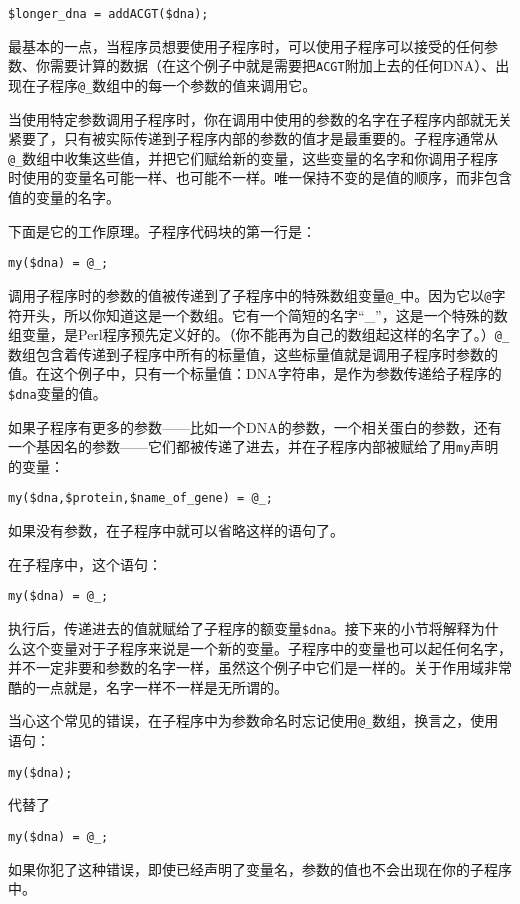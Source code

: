 \begin{lstlisting}
$longer_dna = addACGT($dna);
\end{lstlisting}

最基本的一点，当程序员想要使用子程序时，可以使用子程序可以接受的任何参数、你需要计算的数据（在这个例子中就是需要把\verb|ACGT|附加上去的任何DNA）、出现在子程序\verb|@_|数组中的每一个参数的值来调用它。

当使用特定参数调用子程序时，你在调用中使用的参数的名字在子程序内部就无关紧要了，只有被实际传递到子程序内部的参数的值才是最重要的。子程序通常从\verb|@_|数组中收集这些值，并把它们赋给新的变量，这些变量的名字和你调用子程序时使用的变量名可能一样、也可能不一样。唯一保持不变的是值的顺序，而非包含值的变量的名字。

下面是它的工作原理。子程序代码块的第一行是：

\begin{lstlisting}
my($dna) = @_; 
\end{lstlisting}

调用子程序时的参数的值被传递到了子程序中的特殊数组变量\verb|@_|中。因为它以\verb|@|字符开头，所以你知道这是一个数组。它有一个简短的名字“\_”，这是一个特殊的数组变量，是Perl程序预先定义好的。（你不能再为自己的数组起这样的名字了。）\verb|@_|数组包含着传递到子程序中所有的标量值，这些标量值就是调用子程序时参数的值。在这个例子中，只有一个标量值：DNA字符串，是作为参数传递给子程序的\verb|$dna|变量的值。

如果子程序有更多的参数——比如一个DNA的参数，一个相关蛋白的参数，还有一个基因名的参数——它们都被传递了进去，并在子程序内部被赋给了用\verb|my|声明的变量：

\begin{lstlisting}
my($dna,$protein,$name_of_gene) = @_;
\end{lstlisting}

如果没有参数，在子程序中就可以省略这样的语句了。

在子程序中，这个语句：

\begin{lstlisting}
my($dna) = @_;
\end{lstlisting}

执行后，传递进去的值就赋给了子程序的额变量\verb|$dna|。接下来的小节将解释为什么这个变量对于子程序来说是一个新的变量。子程序中的变量也可以起任何名字，并不一定非要和参数的名字一样，虽然这个例子中它们是一样的。关于作用域非常酷的一点就是，名字一样不一样是无所谓的。

\begin{adjustwidth}{2cm}{2cm}
  \noindent
  当心这个常见的错误，在子程序中为参数命名时忘记使用\verb|@_|数组，换言之，使用语句：
  \begin{lstlisting}
my($dna);
  \end{lstlisting}
  代替了
  \begin{lstlisting}
my($dna) = @_;
  \end{lstlisting}
  如果你犯了这种错误，即使已经声明了变量名，参数的值也不会出现在你的子程序中。
\end{adjustwidth}

